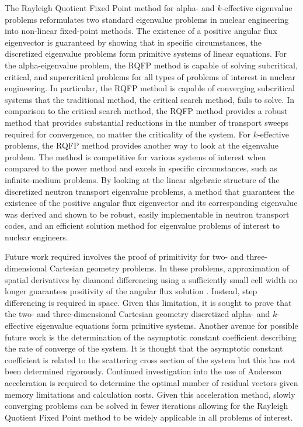 The Rayleigh Quotient Fixed Point method for alpha- and $k$-effective eigenvalue problems reformulates two standard eigenvalue problems in nuclear engineering into non-linear fixed-point methods. The existence of a positive angular flux eigenvector is guaranteed by showing that in specific circumstances, the discretized eigenvalue problems form primitive systems of linear equations. For the alpha-eigenvalue problem, the RQFP method is capable of solving subcritical, critical, and supercritical problems for all types of problems of interest in nuclear engineering. In particular, the RQFP method is capable of converging subcritical systems that the traditional method, the critical search method, fails to solve. In comparison to the critical search method, the RQFP method provides a robust method that provides substantial reductions in the number of transport sweeps required for convergence, no matter the criticality of the system. For $k$-effective problems, the RQFP method provides another way to look at the eigenvalue problem. The method is competitive for various systems of interest when compared to the power method and excels in specific circumstances, such as infinite-medium problems. By looking at the linear algebraic structure of the discretized neutron transport eigenvalue problems, a method that guarantees the existence of the positive angular flux eigenvector and its corresponding eigenvalue was derived and shown to be robust, easily implementable in neutron transport codes, and an efficient solution method for eigenvalue problems of interest to nuclear engineers.

Future work required involves the proof of primitivity for two- and three-dimensional Cartesian geometry problems. In these problems, approximation of spatial derivatives by diamond differencing using a sufficiently small cell width no longer guarantees positivity of the angular flux solution \cite{greenbaum_iterative_1997}. Instead, step differencing is required in space. Given this limitation, it is sought to prove that the two- and three-dimensional Cartesian geometry discretized alpha- and $k$-effective eigenvalue equations form primitive systems. Another avenue for possible future work is the determination of the asymptotic constant coefficient describing the rate of converge of the system. It is thought that the asymptotic constant coefficient is related to the scattering cross section of the system but this has not been determined rigorously. Continued investigation into the use of Anderson acceleration is required to determine the optimal number of residual vectors given memory limitations and calculation costs. Given this acceleration method, slowly converging problems can be solved in fewer iterations allowing for the Rayleigh Quotient Fixed Point method to be widely applicable in all problems of interest.